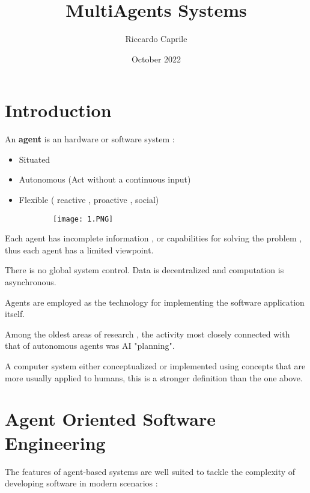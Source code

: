 \documentclass{article}
\title{MultiAgents Systems}
\author{Riccardo Caprile}
\date{October 2022}
\begin{document}
\maketitle


\section{Introduction}

An \textbf{agent} is an hardware or software system :

\begin{itemize}
    \item Situated
    \item Autonomous (Act without a continuous input)
    \item Flexible ( reactive , proactive , social)
\end{itemize}


\begin{figure}[ht!]
  \centering
  \begin{subfigure}[b]{0.6\linewidth}
    \texttt{[image: 1.PNG]}
  \end{subfigure}
\end{figure}

Each agent has incomplete information , or capabilities for solving the problem , thus each agent has a limited viewpoint.

There is no global system control. Data is decentralized and computation is asynchronous.

Agents are employed as the technology for implementing the software application itself.

Among the oldest areas of research , the activity most closely connected with that of autonomous agents was AI "planning". 

A computer system either conceptualized or implemented
using concepts that are more usually applied to humans, this is a stronger definition than the one above.

\vspace{30mm}

\section{Agent Oriented Software Engineering}

The features of agent-based systems are well suited to tackle the complexity of developing software in modern scenarios :
\end{document}
